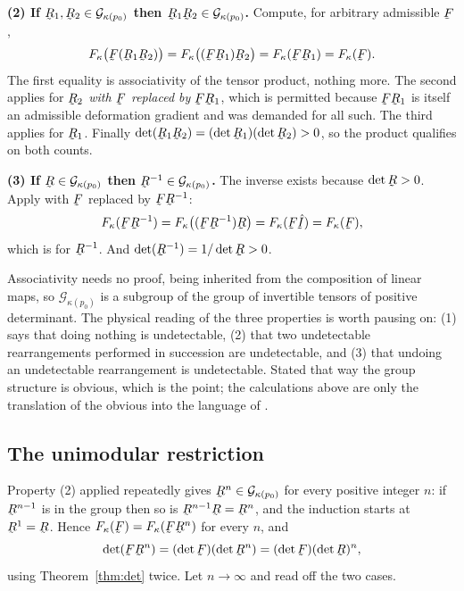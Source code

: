 \medskip
\noindent
\textbf{(2) If $\bR_{1},\bR_{2}\in\mathcal{G}_{\kappa(p_{0})}$ then
$\bR_{1}\bR_{2}\in\mathcal{G}_{\kappa(p_{0})}$.} Compute, for arbitrary
admissible $\bF$,
\[
   F_{\kappa}\big(\bF(\bR_{1}\bR_{2})\big)
   =F_{\kappa}\big((\bF\bR_{1})\bR_{2}\big)
   =F_{\kappa}(\bF\bR_{1})
   =F_{\kappa}(\bF).
\]
The first equality is associativity of the tensor product, nothing more.
The second applies  for $\bR_{2}$ \emph{with $\bF$ replaced by
$\bF\bR_{1}$}, which is permitted because $\bF\bR_{1}$ is itself an
admissible deformation gradient and  was demanded for all such.
The third applies  for $\bR_{1}$. Finally
$\det(\bR_{1}\bR_{2})=(\det\bR_{1})(\det\bR_{2})>0$, so the product
qualifies on both counts.

\medskip
\noindent
\textbf{(3) If $\bR\in\mathcal{G}_{\kappa(p_{0})}$ then
$\bR^{-1}\in\mathcal{G}_{\kappa(p_{0})}$.} The inverse exists because
$\det\bR>0$. Apply  with $\bF$ replaced by $\bF\bR^{-1}$:
\[
   F_{\kappa}(\bF\bR^{-1})
   =F_{\kappa}\big((\bF\bR^{-1})\bR\big)
   =F_{\kappa}(\bF\hI)
   =F_{\kappa}(\bF),
\]
which is  for $\bR^{-1}$. And
$\det(\bR^{-1})=1/\det\bR>0$.

\medskip
Associativity needs no proof, being inherited from the composition of
linear maps, so $\mathcal{G}_{\kappa(p_{0})}$ is a subgroup of the group
of invertible tensors of positive determinant. The physical reading of
the three properties is worth pausing on: (1) says that doing nothing is
undetectable, (2) that two undetectable rearrangements performed in
succession are undetectable, and (3) that undoing an undetectable
rearrangement is undetectable. Stated that way the group structure is
obvious, which is the point; the calculations above are only the
translation of the obvious into the language of .

\subsection*{The unimodular restriction}

Property (2) applied repeatedly gives $\bR^{n}\in
\mathcal{G}_{\kappa(p_{0})}$ for every positive integer $n$: if
$\bR^{n-1}$ is in the group then so is $\bR^{n-1}\bR=\bR^{n}$, and the
induction starts at $\bR^{1}=\bR$. Hence
$F_{\kappa}(\bF)=F_{\kappa}(\bF\bR^{n})$ for every $n$, and
\[
   \det(\bF\bR^{n})=(\det\bF)(\det\bR^{n})=(\det\bF)(\det\bR)^{n},
\]
using Theorem~\ref{thm:det} twice. Let $n\to\infty$ and read off the
two cases.

